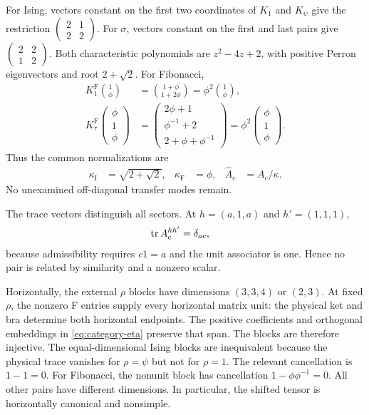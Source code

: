 For Ising, vectors constant on the first two coordinates of $K_1$
and $K_\psi$ give the restriction
$\left(\begin{smallmatrix}2&1\\2&2\end{smallmatrix}\right)$.
For $\sigma$, vectors constant on the first and last pairs give
$\left(\begin{smallmatrix}2&2\\1&2\end{smallmatrix}\right)$.
Both characteristic polynomials are $z^2-4z+2$, with positive
Perron eigenvectors and root $2+\sqrt2$. For Fibonacci,
\begin{align}
	K_1^{\mathrm F}\binom1\phi
	 & =\binom{1+\phi}{1+2\phi}
	=\phi^2\binom1\phi,         \\
	K_\tau^{\mathrm F}
	\begin{pmatrix}\phi\\1\\ \phi\end{pmatrix}
	 & =\begin{pmatrix}
		    2\phi+1     \\
		    \phi^{-1}+2 \\
		    2+\phi+\phi^{-1}
	    \end{pmatrix}
	=\phi^2\begin{pmatrix}\phi\\1\\ \phi\end{pmatrix}.
\end{align}
Thus the common normalizations are
\begin{align}
	\kappa_{\mathrm I} & =\sqrt{2+\sqrt2}, &
	\kappa_{\mathrm F} & =\phi,            &
	\widehat A_c       & =A_c/\kappa.
	\label{eq:kappa}
\end{align}
No unexamined off-diagonal transfer modes remain.

The trace vectors distinguish all sectors. At
$h=(a,1,a)$ and $h'=(1,1,1)$,
\begin{align}
	\operatorname{tr} A_c^{hh'} & =\delta_{ac},
\end{align}
because admissibility requires $c1=a$ and the unit associator is
one. Hence no pair is related by similarity and a nonzero scalar.

Horizontally, the external $\rho$ blocks have dimensions $(3,3,4)$
or $(2,3)$. At fixed $\rho$, the nonzero F entries supply every
horizontal matrix unit: the physical ket and bra determine both
horizontal endpoints. The positive coefficients and orthogonal
embeddings in \cref{eq:category-eta} preserve that span. The blocks
are therefore injective. The equal-dimensional Ising blocks are
inequivalent because the physical trace vanishes for $\rho=\psi$
but not for $\rho=1$. The relevant cancellation is $1-1=0$.
For Fibonacci, the nonunit block has cancellation
$1-\phi\phi^{-1}=0$. All other pairs have different dimensions.
In particular, the shifted tensor is horizontally canonical and
nonsimple.

